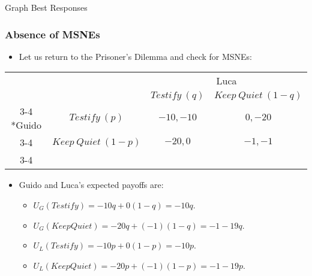 
\begin{frame}{Graph Best Responses}
 
\end{frame}


\begin{frame}
\frametitle{Absence of MSNEs}
\begin{itemize}
	\item Let us return to the Prisoner's Dilemma and check for MSNEs:
\end{itemize}
\begin{table}[h]
	\centering
	\begin{tabular}{cc|c|c|}
		& \multicolumn{1}{c}{} & \multicolumn{2}{c}{Luca}\\
		& \multicolumn{1}{c}{} & \multicolumn{1}{c}{$Testify~(q)$}  & \multicolumn{1}{c}{$Keep~Quiet~(1-q)$} \\\cline{3-4}
		\multirow{2}*{Guido}  & $Testify~(p)$ & $-10,-10$ & $0,-20$ \\\cline{3-4}
		& $Keep~Quiet~(1-p)$ & $-20,0$ & $-1,-1$ \\\cline{3-4}
	\end{tabular}
\end{table}
\begin{itemize}
	\item Guido and Luca's expected payoffs are:
	\begin{itemize}
		\item $U_G(Testify) = -10q + 0(1 - q) = -10q$.
		\item $U_G(Keep Quiet) = -20q + (-1)(1 - q) = -1 - 19q$.
		\item $U_L(Testify) = -10p + 0(1 - p) = -10p$.
		\item $U_L(Keep Quiet) = -20p + (-1)(1 - p) = -1 - 19p$.
	\end{itemize}
\end{itemize}
\end{frame}

